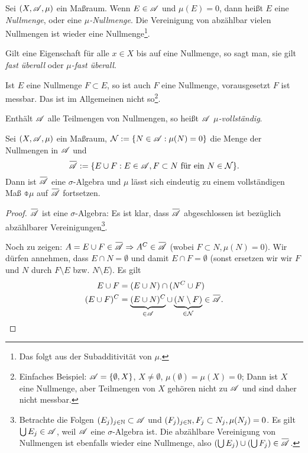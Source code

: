 \begin{deno}
 Sei $(X, \mathscr{A}, \mu)$ ein Maßraum. Wenn $E \in \mathscr{A}$ und $\mu(E) = 0$, dann heißt $E$ eine \emph{Nullmenge}, oder eine \emph{$\mu$-Nullmenge}. Die Vereinigung von abzählbar vielen Nullmengen ist wieder eine Nullmenge\footnote{Das folgt aus der Subadditivität von $\mu$.}.
 
 Gilt eine Eigenschaft für alle $x \in X$ bis auf eine Nullmenge, so sagt man, sie gilt \emph{fast überall} oder \emph{$\mu$-fast überall}.
 
 Ist $E$ eine Nullmenge $F \subset E$, so ist auch $F$ eine Nullmenge, vorausgesetzt $F$ ist messbar. Das ist im Allgemeinen nicht so\footnote{Einfaches Beispiel: $\mathscr{A} = \{ \emptyset, X \}$, $X \ne \emptyset$, $\mu( \emptyset ) = \mu(X) = 0$; Dann ist $X$ eine Nullmenge, aber Teilmengen von $X$ gehören nicht zu $\mathscr{A}$ und sind daher nicht messbar.}.
 
 Enthält $\mathscr{A}$ alle Teilmengen von Nullmengen, so heißt $\mathscr{A}$ \emph{$\mu$-vollständig}.
\end{deno}

\begin{thm}
 Sei $(X, \mathscr{A}, \mu)$ ein Maßraum, $\mathcal{N} := \{ N \in \mathscr{A}: \mu(N) = 0 \}$ die Menge der Nullmengen in $\mathscr{A}$ und 
 \[ \obar{\mA} := \{ E \cup F : E \in \mA, F \subset N \text{ für ein } N \in \mathcal{N} \}. \]
 Dann ist $\obar{\mA}$ eine $\sigma$-Algebra und $\mu$ lässt sich eindeutig zu einem vollständigen Maß $\obar{\mu}$ auf $\obar{\mA}$ fortsetzen.
\end{thm}

\begin{proof}
 $\obar{\mA}$ ist eine $\sigma$-Algebra: Es ist klar, dass $\obar{\mA}$ abgeschlossen ist bezüglich abzählbarer Vereinigungen\footnote{Betrachte die Folgen $(E_j)_{j \in \mathbb{N}} \subset \mathscr{A}$ und $(F_j)_{j \in \mathbb{N}}, F_j \subset N_j, \mu(N_j) = 0$. Es gilt $\bigcup E_j \in \mathscr{A}$, weil $\mathscr{A}$ eine $\sigma$-Algebra ist. Die abzählbare Vereinigung von Nullmengen ist ebenfalls wieder eine Nullmenge, also $(\bigcup E_j) \cup (\bigcup F_j) \in \obar{\mA}$.}.
 
 Noch zu zeigen: $A = E \cup F \in \obar{\mA} \Rightarrow A^C \in \obar{\mA}$ (wobei $F \subset N, \mu(N) = 0$). Wir dürfen annehmen, dass $E \cap N = \emptyset$ und damit $E \cap F = \emptyset$ (sonst ersetzen wir wir $F$ und $N$ durch $F \setminus E$ bzw. $N \setminus E$). Es gilt
 \begin{align*}
  E \cup F &= ( E \cup N ) \cap (N^C \cup F) \\
  (E \cup F)^C &= \underbrace{( E \cup N )^C}_{\in \mA} \cup \underbrace{(N \setminus F)}_{\in \mathcal{N}} \in \obar{\mA}. \qedhere
 \end{align*}
\end{proof}

